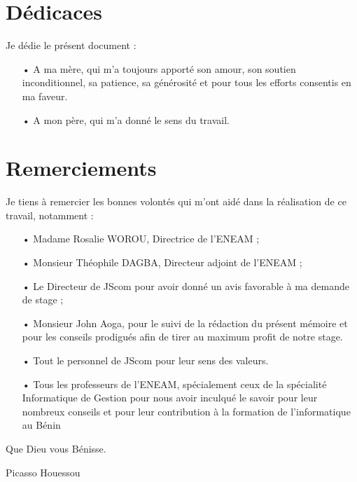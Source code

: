 \documentclass[a4paper,12pt,french]{report} %
\begin{document}

\chapter*{Dédicaces}
Je dédie le présent document :
\begin{itemize}
\item[•] A ma mère, qui m'a toujours apporté son amour, son soutien inconditionnel, sa patience, sa générosité et pour tous les efforts consentis en ma faveur.
\item[•] A mon père, qui m'a donné le sens du travail. 
\end{itemize}

\chapter*{Remerciements}
	Je tiens à remercier les bonnes volontés qui m'ont aidé dans la réalisation de ce travail, notamment :
\begin{itemize}
	\item[•] Madame Rosalie WOROU, Directrice de l'ENEAM ;
 	\item[•] Monsieur Théophile DAGBA, Directeur adjoint de l'ENEAM ;
	\item[•] Le Directeur de JScom pour avoir donné un avis favorable à ma demande de stage ;
	\item[•] Monsieur John Aoga, pour le suivi de la rédaction du présent mémoire et pour les conseils prodigués afin de tirer au maximum profit de notre stage.
	\item[•] Tout le personnel de JScom pour leur sens des valeurs.
	\item[•] Tous les professeurs de l'ENEAM, spécialement ceux de la spécialité Informatique de Gestion pour nous avoir inculqué le savoir  pour leur nombreux conseils et pour leur contribution à la formation de l'informatique au Bénin	
\end{itemize}
Que Dieu vous Bénisse.
\begin{flushright}
Picasso Houessou
\end{flushright}

\end{document}
